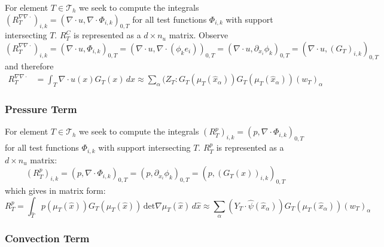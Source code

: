 \documentclass[a4paper,
		     12pt,
		     DIV10,
		     DIVcalc,
		     headings=normal,
		     oneside,
		     bibliography=totoc,
		     headsepline=false,
		     headinclude]{scrartcl}
\theoremstyle{definition}
\begin{document}
For element $T\in\mathcal{T}_h$ we seek to compute the integrals 
$(R^{\nabla\nabla\cdot}_T)_{i,k} = (\nabla\cdot u,\nabla\cdot\Phi_{i,k})_{0,T}$ for all test functions $\Phi_{i,k}$
with support intersecting $T$. $R^C_T$ is represented as a $d\times n_u$ matrix. Observe
\begin{equation*}
(R^{\nabla\nabla\cdot}_T)_{i,k} = \left(\nabla\cdot u,\Phi_{i,k}\right)_{0,T} 
= \left(\nabla\cdot u,\nabla\cdot(\phi_{k}e_i) \right )_{0,T} 
= \left(\nabla\cdot u, \partial_{x_i}\phi_{k} \right )_{0,T} 
= \left(\nabla\cdot u, (G_T)_{i,k} \right )_{0,T} 
\end{equation*}
and therefore
\begin{equation*}
\begin{split}
R^{\nabla\nabla\cdot}_T &= \int_T \nabla\cdot u(x) G_T(x)  \,dx
\approx \sum_\alpha (Z_T : G_T(\mu_T(\hat x_\alpha)) G_T(\mu_T(\hat x_\alpha)) (w_T)_\alpha
\end{split}
\end{equation*}

\subsubsection*{Pressure Term}

For element $T\in\mathcal{T}_h$ we seek to compute the integrals 
$(R^{p}_T)_{i,k} = ( p, \nabla\cdot\Phi_{i,k})_{0,T}$ for all test functions $\Phi_{i,k}$
with support intersecting $T$. $R^p_T$ is represented as a $d\times n_u$ matrix:
\begin{equation*}
(R^{p}_T)_{i,k} = \left( p,\nabla\cdot\Phi_{i,k}\right)_{0,T} =  \left( p,\partial_{x_i}\phi_{k}\right)_{0,T} 
=  \left( p, (G_T(x))_{i,k} \right)_{0,T}
\end{equation*}
which gives in matrix form:
\begin{equation}
R^{p}_T = \int_{\hat T} p(\mu_T(\hat x)) G_T(\mu_T(\hat x) ) \, \text{det} \nabla\mu_T(\hat x) \,d\hat x
\approx \sum_\alpha (Y_T \cdot \hat\psi(\hat x_\alpha) ) G_T(\mu_T(\hat x_\alpha))  (w_T)_\alpha
\end{equation}

\subsubsection*{Convection Term}
\end{document}
